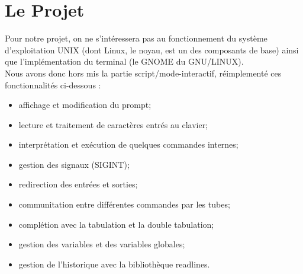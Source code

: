 \section{Le Projet} \label{Section_ref}
Pour notre projet, on ne s'intéressera pas au fonctionnement du système d'exploitation UNIX (dont Linux, le noyau, est un des composants de base) ainsi que l'implémentation du terminal (le GNOME du GNU/LINUX).\\

Nous avons donc hors mis la partie script/mode-interactif, réimplementé ces fonctionnalités ci-dessous : 
\begin{itemize}
    \item affichage et modification du prompt;
    \item lecture et traitement de caractères entrés au clavier;
    \item interprétation et exécution de quelques commandes internes;
    \item gestion des signaux (SIGINT);
    \item redirection des entrées et sorties;
    \item communitation entre différentes commandes par les tubes;
    \item complétion avec la tabulation et la double tabulation;
    \item gestion des variables et des variables globales;
    \item gestion de l'historique avec la bibliothèque readlines.
\end{itemize}
